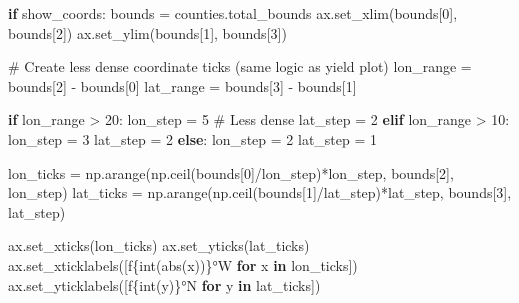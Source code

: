 \documentclass[
  letterpaper,
  DIV=11,
  numbers=noendperiod]{scrreprt}
\newenvironment{Shaded}{\begin{snugshade}}{\end{snugshade}}
\newcommand{\BuiltInTok}[1]{\textcolor[rgb]{0.00,0.23,0.31}{#1}}
\newcommand{\CommentTok}[1]{\textcolor[rgb]{0.37,0.37,0.37}{#1}}
\newcommand{\ControlFlowTok}[1]{\textcolor[rgb]{0.00,0.23,0.31}{\textbf{#1}}}
\newcommand{\DecValTok}[1]{\textcolor[rgb]{0.68,0.00,0.00}{#1}}
\newcommand{\KeywordTok}[1]{\textcolor[rgb]{0.00,0.23,0.31}{\textbf{#1}}}
\newcommand{\NormalTok}[1]{\textcolor[rgb]{0.00,0.23,0.31}{#1}}
\newcommand{\OperatorTok}[1]{\textcolor[rgb]{0.37,0.37,0.37}{#1}}
\newcommand{\SpecialCharTok}[1]{\textcolor[rgb]{0.37,0.37,0.37}{#1}}
\newcommand{\SpecialStringTok}[1]{\textcolor[rgb]{0.13,0.47,0.30}{#1}}
\begin{document}
\begin{Shaded}
\begin{Highlighting}[]
    \ControlFlowTok{if}\NormalTok{ show\_coords:}
\NormalTok{        bounds }\OperatorTok{=}\NormalTok{ counties.total\_bounds}
\NormalTok{        ax.set\_xlim(bounds[}\DecValTok{0}\NormalTok{], bounds[}\DecValTok{2}\NormalTok{])}
\NormalTok{        ax.set\_ylim(bounds[}\DecValTok{1}\NormalTok{], bounds[}\DecValTok{3}\NormalTok{])}

        \CommentTok{\# Create less dense coordinate ticks (same logic as yield plot)}
\NormalTok{        lon\_range }\OperatorTok{=}\NormalTok{ bounds[}\DecValTok{2}\NormalTok{] }\OperatorTok{{-}}\NormalTok{ bounds[}\DecValTok{0}\NormalTok{]}
\NormalTok{        lat\_range }\OperatorTok{=}\NormalTok{ bounds[}\DecValTok{3}\NormalTok{] }\OperatorTok{{-}}\NormalTok{ bounds[}\DecValTok{1}\NormalTok{]}

        \ControlFlowTok{if}\NormalTok{ lon\_range }\OperatorTok{\textgreater{}} \DecValTok{20}\NormalTok{:}
\NormalTok{            lon\_step }\OperatorTok{=} \DecValTok{5}    \CommentTok{\# Less dense}
\NormalTok{            lat\_step }\OperatorTok{=} \DecValTok{2}
        \ControlFlowTok{elif}\NormalTok{ lon\_range }\OperatorTok{\textgreater{}} \DecValTok{10}\NormalTok{:}
\NormalTok{            lon\_step }\OperatorTok{=} \DecValTok{3}
\NormalTok{            lat\_step }\OperatorTok{=} \DecValTok{2}
        \ControlFlowTok{else}\NormalTok{:}
\NormalTok{            lon\_step }\OperatorTok{=} \DecValTok{2}
\NormalTok{            lat\_step }\OperatorTok{=} \DecValTok{1}

\NormalTok{        lon\_ticks }\OperatorTok{=}\NormalTok{ np.arange(np.ceil(bounds[}\DecValTok{0}\NormalTok{]}\OperatorTok{/}\NormalTok{lon\_step)}\OperatorTok{*}\NormalTok{lon\_step, bounds[}\DecValTok{2}\NormalTok{], lon\_step)}
\NormalTok{        lat\_ticks }\OperatorTok{=}\NormalTok{ np.arange(np.ceil(bounds[}\DecValTok{1}\NormalTok{]}\OperatorTok{/}\NormalTok{lat\_step)}\OperatorTok{*}\NormalTok{lat\_step, bounds[}\DecValTok{3}\NormalTok{], lat\_step)}

\NormalTok{        ax.set\_xticks(lon\_ticks)}
\NormalTok{        ax.set\_yticks(lat\_ticks)}
\NormalTok{        ax.set\_xticklabels([}\SpecialStringTok{f\textquotesingle{}}\SpecialCharTok{\{}\BuiltInTok{int}\NormalTok{(}\BuiltInTok{abs}\NormalTok{(x))}\SpecialCharTok{\}}\SpecialStringTok{°W\textquotesingle{}} \ControlFlowTok{for}\NormalTok{ x }\KeywordTok{in}\NormalTok{ lon\_ticks])}
\NormalTok{        ax.set\_yticklabels([}\SpecialStringTok{f\textquotesingle{}}\SpecialCharTok{\{}\BuiltInTok{int}\NormalTok{(y)}\SpecialCharTok{\}}\SpecialStringTok{°N\textquotesingle{}} \ControlFlowTok{for}\NormalTok{ y }\KeywordTok{in}\NormalTok{ lat\_ticks])}


\end{Highlighting}
\end{Shaded}
\end{document}
